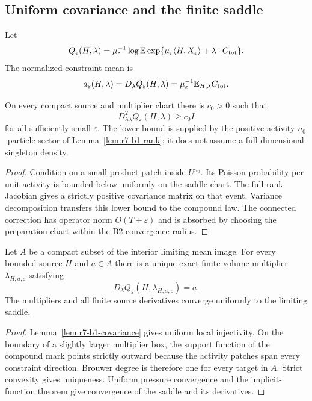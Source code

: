 \subsection{Uniform covariance and the finite saddle}

Let
\[
 Q_\varepsilon(H,\lambda)
 =\mu_\varepsilon^{-1}
  \log\mathbb E\exp\{\mu_\varepsilon\langle H,X_\varepsilon\rangle
  +\lambda\cdot C_{\rm tot}\}.
\]
The normalized constraint mean is
\[
 a_\varepsilon(H,\lambda)=D_\lambda Q_\varepsilon(H,\lambda)
 =\mu_\varepsilon^{-1}
   \mathbb E_{H,\lambda}C_{\rm tot}.
\]

\begin{lemma}
\label{lem:r7-b1-covariance}
On every compact source and multiplier chart there is $c_0>0$ such that
\[
 D_{\lambda\lambda}^2Q_\varepsilon(H,\lambda)\ge c_0I
\]
for all sufficiently small $\varepsilon$.  The lower bound is supplied by the
positive-activity $n_0$-particle sector of
Lemma~\ref{lem:r7-b1-rank}; it does not assume a full-dimensional singleton
density.
\end{lemma}

\begin{proof}
Condition on a small product patch inside $U^{n_0}$.  Its Poisson probability
per unit activity is bounded below uniformly on the saddle chart.  The
full-rank Jacobian gives a strictly positive covariance matrix on that event.
Variance decomposition transfers this lower bound to the compound law.  The
connected correction has operator norm $O(T+\varepsilon)$ and is absorbed by
choosing the preparation chart within the B2 convergence radius.
\end{proof}

\begin{theorem}
\label{thm:r7-b1-saddle}
Let $A$ be a compact subset of the interior limiting mean image.  For every
bounded source $H$ and $a\in A$ there is a unique exact finite-volume
multiplier $\lambda_{H,a,\varepsilon}$ satisfying
\[
 D_\lambda Q_\varepsilon(H,\lambda_{H,a,\varepsilon})=a.
\]
The multipliers and all finite source derivatives converge uniformly to the
limiting saddle.
\end{theorem}

\begin{proof}
Lemma~\ref{lem:r7-b1-covariance} gives uniform local injectivity.  On the
boundary of a slightly larger multiplier box, the support function of the
compound mark points strictly outward because the activity patches span every
constraint direction.  Brouwer degree is therefore one for every target in
$A$.  Strict convexity gives uniqueness.  Uniform pressure convergence and the
implicit-function theorem give convergence of the saddle and its derivatives.
\end{proof}


